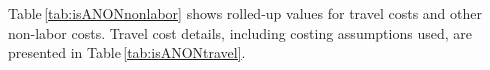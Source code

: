 \documentclass[usenames,dvipsnames,modern]{CLASS_FILES/aastex631}
\begin{document}
\def\BannerColor{Blue} %
\def\BannerFontColor{Blue} %
\def\BannerBoldface#1{\textbf#1} %
\def\CostLabelColor{Blue} %
\def\YearLabelColor{Blue} %
\def\TotalLabelColor{Blue} %
\def\ColumnBoldface#1{\textbf#1} %
\def\TotalBoldface#1{\textbf#1} %
\def\fm1#1{\textbf#1} %
\def\fm2#1{\textit#1} %
\def\fm3#1{\textbf#1} %
\def\fm4#1{\textit#1} %
%
Table\,\ref{tab:isANONnonlabor} shows rolled-up values for travel costs and other non-labor costs. Travel cost details, including costing assumptions used, are presented in Table\,\ref{tab:isANONtravel}.
\end{document}
